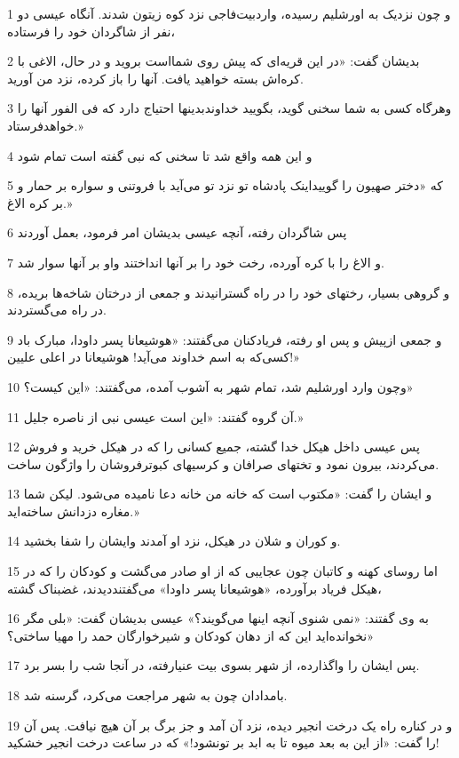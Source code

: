 \par 1 و چون نزدیک به اورشلیم رسیده، واردبیت‌فاجی نزد کوه زیتون شدند. آنگاه عیسی دو نفر از شاگردان خود را فرستاده،
\par 2 بدیشان گفت: «در این قریه‌ای که پیش روی شمااست بروید و در حال، الاغی با کره‌اش بسته خواهید یافت. آنها را باز کرده، نزد من آورید.
\par 3 وهرگاه کسی به شما سخنی گوید، بگویید خداوندبدینها احتیاج دارد که فی الفور آنها را خواهدفرستاد.»
\par 4 و این همه واقع شد تا سخنی که نبی گفته است تمام شود
\par 5 که «دختر صهیون را گوییداینک پادشاه تو نزد تو می‌آید با فروتنی و سواره بر حمار و بر کره الاغ.»
\par 6 پس شاگردان رفته، آنچه عیسی بدیشان امر فرمود، بعمل آوردند
\par 7 و الاغ را با کره آورده، رخت خود را بر آنها انداختند واو بر آنها سوار شد.
\par 8 و گروهی بسیار، رختهای خود را در راه گسترانیدند و جمعی از درختان شاخه‌ها بریده، در راه می‌گستردند.
\par 9 و جمعی ازپیش و پس او رفته، فریادکنان می‌گفتند: «هوشیعانا پسر داودا، مبارک باد کسی‌که به اسم خداوند می‌آید! هوشیعانا در اعلی علیین!»
\par 10 وچون وارد اورشلیم شد، تمام شهر به آشوب آمده، می‌گفتند: «این کیست؟»
\par 11 آن گروه گفتند: «این است عیسی نبی از ناصره جلیل.»
\par 12 پس عیسی داخل هیکل خدا گشته، جمیع کسانی را که در هیکل خرید و فروش می‌کردند، بیرون نمود و تختهای صرافان و کرسیهای کبوترفروشان را واژگون ساخت.
\par 13 و ایشان را گفت: «مکتوب است که خانه من خانه دعا نامیده می‌شود. لیکن شما مغاره دزدانش ساخته‌اید.»
\par 14 و کوران و شلان در هیکل، نزد او آمدند وایشان را شفا بخشید.
\par 15 اما روسای کهنه و کاتبان چون عجایبی که از او صادر می‌گشت و کودکان را که در هیکل فریاد برآورده، «هوشیعانا پسر داودا» می‌گفتنددیدند، غضبناک گشته،
\par 16 به وی گفتند: «نمی شنوی آنچه اینها می‌گویند؟» عیسی بدیشان گفت: «بلی مگر نخوانده‌اید این که از دهان کودکان و شیرخوارگان حمد را مهیا ساختی؟»
\par 17 پس ایشان را واگذارده، از شهر بسوی بیت عنیارفته، در آنجا شب را بسر برد.
\par 18 بامدادان چون به شهر مراجعت می‌کرد، گرسنه شد.
\par 19 و در کناره راه یک درخت انجیر دیده، نزد آن آمد و جز برگ بر آن هیچ نیافت. پس آن را گفت: «از این به بعد میوه تا به ابد بر تونشود!» که در ساعت درخت انجیر خشکید!
